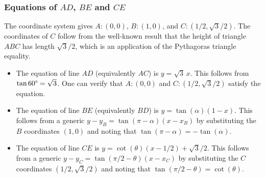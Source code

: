 \subsubsection*{Equations of $AD$, $BE$ and $CE$}
The coordinate system gives $A:(0,0)$, $B:(1,0)$, and $C:(1/2,\sqrt{3}/2)$. The coordinates of $C$ follow from the well-known result that the height of triangle $ABC$ has length $\sqrt{3}/2$, which is an application of the Pythagoras triangle equality. 
\begin{itemize}
\item The equation of line $AD$ (equivalently $AC$) is $y=\sqrt{3}\,x$. This follows from $\tan60\degree=\sqrt{3}$. One can verify that $A:(0,0)$ and $C:(1/2,\sqrt{3}/2)$ satisfy the equation. 
\item The equation of line $BE$ (equivalently $BD$) is $y=\tan(\alpha)(1-x)$. This follows from a generic $y-y_{B}=\tan(\pi-\alpha)(x-x_{B})$ by substituting the $B$ coordinates $(1,0)$ and noting that $\tan(\pi-\alpha)=-\tan(\alpha)$. 
\item The equation of line $CE$ is $y=\cot(\theta)(x-1/2)+\sqrt{3}/2$. This follows from a generic $y-y_{C}=\tan(\pi/2-\theta)(x-x_{C})$ by substituting the $C$ coordinates $(1/2,\sqrt{3}/2)$ and noting that $\tan(\pi/2-\theta)=\cot(\theta)$. 
\end{itemize}


